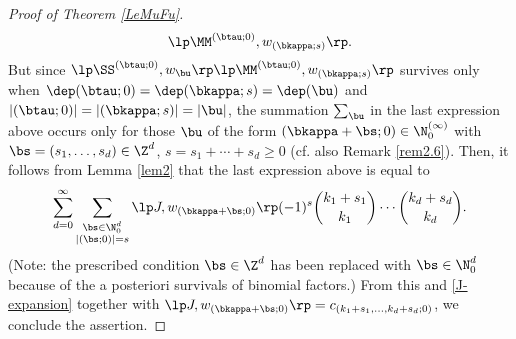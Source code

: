 \begin{proof}[Proof of Theorem \ref{LeMuFu}]
\begin{align*}
\lp \MM^{(\btau;0)}, w_{(\bkappa;s)} \rp .
\end{align*}
But since $\lp\SS^{(\btau;0)},w_\bu\rp \lp \MM^{(\btau;0)}, w_{(\bkappa;s)} \rp$ 
survives only when 
$\dep(\btau;0)=\dep(\bkappa;s)=\dep(\bu)$ and $|(\btau;0)|=|(\bkappa;s)|=|\bu|$,
the summation $\sum_\bu$ in the last expression above occurs only for 
those $\bu$ of the form 
$(\bkappa+\bs;0)\in \N_0^{(\infty)}$ 
with $\bs=(s_1,\dots,s_d)\in\Z^d$, 
$s=s_1+\cdots+s_d\ge 0$
(cf. also Remark \ref{rem2.6}).  
Then, it follows from Lemma \ref{lem2} that the last expression above is equal to 
$$
\sum_{d=0}^\infty \sum_{\substack{\bs\in\N_0^d \\ |(\bs;0)|=s}} 
\lp J, w_{(\bkappa+\bs;0)} \rp
(-1)^s
\binom{k_1+s_1}{k_1}\cdots \binom{k_d+s_d}{k_d}.
$$
(Note: the prescribed condition $\bs\in\Z^d$ has been replaced 
with $\bs\in\N_0^d$ because of the a posteriori survivals of binomial factors.)
From this and \eqref{J-expansion} together with
$\lp J, w_{(\bkappa+\bs;0)} \rp=c_{(k_1+s_1,\dots,k_d+s_d;0)}$, 
we conclude the assertion.
\end{proof}

